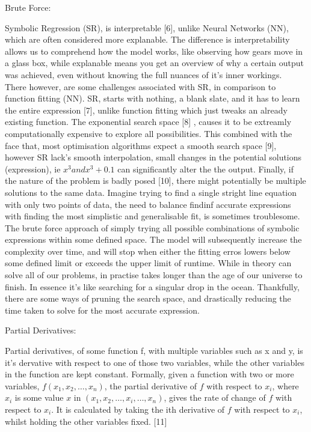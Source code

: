 \documentclass{article}
\begin{document}
\begin{center} 
  {\Large Brute Force:}
\end{center}

Symbolic Regression (SR), is interpretable [6], unlike Neural Networks (NN), which are often considered more explanable. The difference is interpretability allows us to comprehend how the model works, like observing how gears move in a glass box, while explanable means you get an overview of why a certain output was achieved, even without knowing the full nuances of it's inner workings.\\ 

There however, are some challenges associated with SR, in comparison to function fitting (NN). SR, starts with nothing, a blank slate, and it has to learn the entire expression [7], unlike function fitting which just tweaks an already existing function. The exponential search space [8] , causes it to be extreamly computationally expensive to explore all possibilities. This combined with the face that, most optimisation algorithms expect a smooth search space [9], however SR lack's smooth interpolation, small changes in the potential solutions (expression), ie $x^3 and x^3+0.1$ can significantly alter the the output. Finally, if the nature of the problem is badly posed [10], there might potentially be multiple solutions to the same data. Imagine trying to find a single stright line equation with only two points of data, the need to balance findinf accurate expressions with finding the most simplistic and generalisable fit, is sometimes troublesome.\\

The brute force approach of simply trying all possible combinations of symbolic expressions within some defined space. The model will subsequently increase the complexity over time, and will stop when either the fitting erros lowers below some defined limit or exceeds the upper limit of runtime. While in theory can solve all of our problems, in practise takes longer than the age of our universe to finish. In essence it's like searching for a singular drop in the ocean. Thankfully, there are some ways of pruning the search space, and drastically reducing the time taken to solve for the most accurate expression. \\ 

\begin{center} 
  {\Large Partial Derivatives:}
\end{center}

Partial derivatives, of some function f, with multiple variables such as x and y, is it's dervative with respect to one of those two variables, while the other variables in the function are kept constant. Formally, given a function with two or more variables, $f(x_1, x_2, \ldots, x_n) $, the partial derivative of $f$ with respect to $x_i$, where $x_i$ is some value $x$ in $(x_1, x_2, \ldots, x_i, \ldots, x_n)$, gives the rate of change of $f$ with respect to $x_i$. It is calculated by taking the ith derivative of $f$ with respect to $x_i$, whilst holding the other variables fixed. [11] \\
\end{document}
